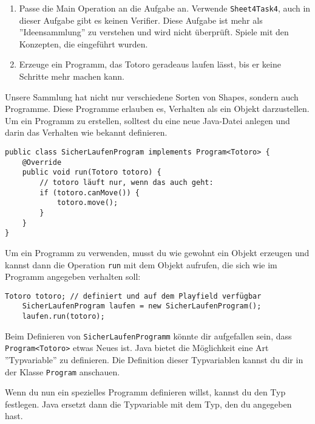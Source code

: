 
\begin{enumerate}
	\item Passe die Main Operation an die Aufgabe an.
		Verwende \lstinline{Sheet4Task4}, auch in dieser Aufgabe gibt es keinen Verifier.
		Diese Aufgabe ist mehr als ''Ideensammlung'' zu verstehen und wird nicht überprüft.
		Spiele mit den Konzepten, die eingeführt wurden.
	\item Erzeuge ein Programm, das Totoro geradeaus laufen lässt, bis er keine Schritte mehr machen kann.
\end{enumerate}

\begin{Infobox}[Programme]
	Unsere Sammlung hat nicht nur verschiedene Sorten von Shapes, sondern auch Programme.
	Diese Programme erlauben es, Verhalten als ein Objekt darzustellen.
	Um ein Programm zu erstellen, solltest du eine neue Java-Datei anlegen und darin das Verhalten wie bekannt definieren.

	\begin{lstlisting}[title=SicherLaufenProgram.java, numbers=none,xleftmargin=0.5cm]
public class SicherLaufenProgram implements Program<Totoro> {
	@Override
	public void run(Totoro totoro) {
		// totoro läuft nur, wenn das auch geht:
		if (totoro.canMove()) {
			totoro.move();
		}
	}
}
	\end{lstlisting}

	Um ein Programm zu verwenden, musst du wie gewohnt ein Objekt erzeugen und kannst dann die Operation \lstinline{run} mit dem Objekt aufrufen, die sich wie im Programm angegeben verhalten soll:

	\begin{lstlisting}[numbers=none,xleftmargin=0.5cm]
	Totoro totoro; // definiert und auf dem Playfield verfügbar
	SicherLaufenProgram laufen = new SicherLaufenProgram();
	laufen.run(totoro);
	\end{lstlisting}
\end{Infobox}

\begin{Infobox}
	Beim Definieren von \lstinline{SicherLaufenProgramm} könnte dir aufgefallen sein, dass \mbox{\lstinline{Program<Totoro>}} etwas Neues ist.
	Java bietet die Möglichkeit eine Art ''Typvariable'' zu definieren.
	Die Definition dieser Typvariablen kannst du dir in der Klasse \lstinline{Program} anschauen.

	Wenn du nun ein spezielles Programm definieren willst, kannst du den Typ festlegen.
	Java ersetzt dann die Typvariable mit dem Typ, den du angegeben hast.
\end{Infobox}

